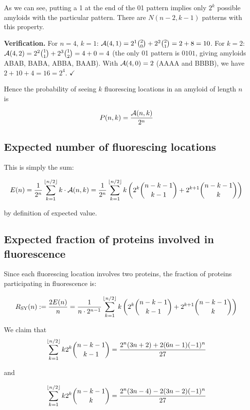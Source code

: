 \documentclass[referee,lineno,pdflatex,sn-mathphys-ay]{sn-jnl}
\DeclarePairedDelimiter\floor{\lfloor}{\rfloor}
\newcommand{\cA}{ {\cal A} }
\begin{document}
As we can see, putting a 1 at the end of the 01 pattern implies only $2^k$ possible amyloids with the particular pattern. There are $N(n-2, k - 1)$ patterns with this property.

\textbf{Verification.} For $n = 4$, $k = 1$: $\cA(4,1) = 2^1 \binom{2}{0} + 2^2 \binom{2}{1} = 2 + 8 = 10$. For $k = 2$: $\cA(4,2) = 2^2 \binom{1}{1} + 2^3 \binom{1}{2} = 4 + 0 = 4$ (the only 01 pattern is $0101$, giving amyloids ABAB, BABA, ABBA, BAAB). With $\cA(4,0) = 2$ (AAAA and BBBB), we have $2 + 10 + 4 = 16 = 2^4$. $\checkmark$

Hence the probability of seeing $k$ fluorescing locations in an amyloid of length $n$ is

\[
P(n,k) = \frac{\cA(n,k)}{2^n}
\]

\subsection{Expected number of fluorescing locations}

This is simply the sum:

\[
    E(n) = \frac{1}{2^n}\sum_{k=1}^{\floor{n/2}} k \cdot \cA(n,k) = \frac{1}{2^n}\sum_{k=1}^{\floor{n/2}} k \left( 2^k \binom{n-k-1}{k-1} + 2^{k+1} \binom{n-k-1}{k} \right)
\]

by definition of expected value.

\subsection{Expected fraction of proteins involved in fluorescence}\label{subsec:sy-ratio}

Since each fluorescing location involves two proteins, the fraction of proteins participating in fluorescence is:

\[
    R_{\text{SY}}(n) := \frac{2E(n)}{n} = \frac{1}{n \cdot 2^{n-1}}\sum_{k=1}^{\floor{n/2}} k \left( 2^k \binom{n-k-1}{k-1} + 2^{k+1} \binom{n-k-1}{k} \right)
\]

We claim that
\begin{equation}\label{eq:sum1}
\sum_{k=1}^{\floor{n/2}} k 2^k \binom{n-k-1}{k-1} = \frac{2^n (3n+2) + 2(6n-1)(-1)^n}{27}
\end{equation}

and

\begin{equation}\label{eq:sum2}
\sum_{k=1}^{\floor{n/2}} k 2^k \binom{n-k-1}{k} = \frac{2^n (3n-4)-2(3n-2)(-1)^n}{27}
\end{equation}
\end{document}
